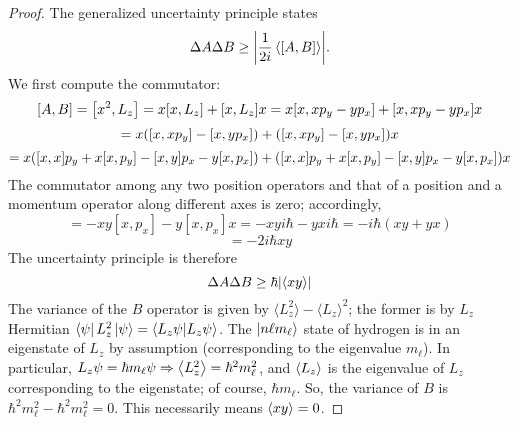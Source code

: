 \documentclass{article}
\begin{document}
\begin{proof}
  The generalized uncertainty principle states
  \[
    \Delta A\Delta B \geq \qty|\frac{1}{2i}\expval{\qty[{A}, {B}]}|.
  \]
  We first compute the commutator:
  \[
    \qty[A, B] = \qty[x^{2}, L_{z}] = x\qty[x, L_{z}] + \qty[x, L_{z}]x
    = x\qty[x, xp_{y} - yp_{x}] + \qty[x, xp_{y} - yp_{x}]x
  \]
  \[
    = x\qty([x, xp_{y}] - [x, yp_{x}]) + \qty([x, xp_{y}] - [x, yp_{x}])x
  \]
  \[
    = x\qty([x, x]p_{y} + x[x, p_{y}] - [x, y]p_{x} - y[x, p_{x}]) + \qty([x, x]p_{y} + x[x, p_{y}] - [x, y]p_{x} - y[x, p_{x}])x
  \]
  The commutator among any two position operators and that of a position and a momentum operator along different axes is zero; accordingly,
  \[
    = -xy[x, p_{x}] - y[x, p_{x}]x
    = -xyi\hbar - yxi\hbar
    = -i\hbar(xy + yx)
  \]
  \[
    = -2i\hbar xy
  \]
  The uncertainty principle is therefore
  \[
    \Delta A \Delta B \geq \hbar\qty|\expval{xy}|
  \]
  The variance of the $B$ operator is given by $\langle L_{z}^{2} \rangle - \langle L_{z} \rangle^{2}$;
  the former is by $L_{z}$ Hermitian $\bra{\psi}L_{z}^{2}\ket{\psi} = \bra{L_{z}\psi}\ket{L_{z}\psi}$.
  The $\ket{n\ell m_{\ell}}$ state of hydrogen is in an eigenstate of $L_{z}$ by assumption (corresponding to the eigenvalue $m_{\ell}$).
  In particular, $L_{z} \psi = \hbar m_{\ell}\psi \Rightarrow \expval{L_{z}^{2}} = \hbar^{2}m_{\ell}^{2}$,
  and $\expval{L_{z}}$ is the eigenvalue of $L_{z}$ corresponding to the eigenstate; of course, $\hbar m_{\ell}$.
  So, the variance of $B$ is $\hbar^{2}m_{\ell}^{2} - \hbar^{2}m_{\ell}^{2} = 0$.
  This necessarily means $\expval{xy} = 0$.
\end{proof}
\end{document}
